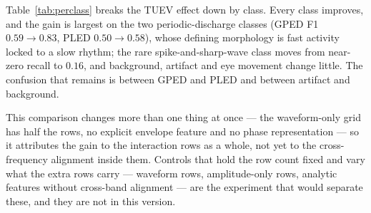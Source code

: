 Table~\ref{tab:perclass} breaks the TUEV effect down by class. Every
class improves, and the gain is largest on the two periodic-discharge
classes (GPED F1 $0.59 \to 0.83$, PLED $0.50 \to 0.58$), whose defining
morphology is fast activity locked to a slow rhythm; the rare
spike-and-sharp-wave class moves from near-zero recall to $0.16$, and
background, artifact and eye movement change little. The confusion that
remains is between GPED and PLED and between artifact and background.

This comparison changes more than one thing at once --- the waveform-only
grid has half the rows, no explicit envelope feature and no phase
representation --- so it attributes the gain to the interaction rows as a
whole, not yet to the cross-frequency alignment inside them. Controls
that hold the row count fixed and vary what the extra rows carry ---
waveform rows, amplitude-only rows, analytic features without cross-band
alignment --- are the experiment that would separate these, and they are
not in this version.

\begin{table}[t]
\centering
\scriptsize
\caption{Duplex vs.\ waveform-only tokenizer in the same encoder, seizure detection. Single seeds.}
\label{tab:abl-seizure}
\end{table}

